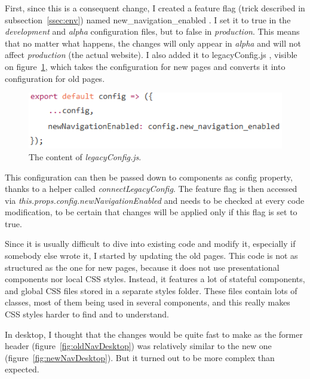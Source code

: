 First, since this is a consequent change, I created a feature flag (trick described in {\sc subsection}~\ref{ssec:env}) named \guillemotleft{} new\_navigation\_enabled \guillemotright{}. I set it to true in the \textit{development} and \textit{alpha} configuration files, but to false in \textit{production}. This means that no matter what happens, the changes will only appear in \textit{alpha} and will not affect \textit{production} (the actual website). I also added it to \guillemotleft{} legacyConfig.js \guillemotright{}, visible on {\sc figure}~\ref{fig:legacyConfig}, which takes the configuration for new pages and converts it into configuration for old pages.

\begin{figure}[H]
    \centering
    \includegraphics[scale=0.8]{figure/legacyConfig.png}
    \caption{The content of \textit{legacyConfig.js}.}
    \label{fig:legacyConfig}
\end{figure}

This configuration can then be passed down to components as \guillemotleft{} config \guillemotright{} property, thanks to a helper called \textit{connectLegacyConfig}. The feature flag is then accessed via \textit{this.props.config.newNavigationEnabled} and needs to be checked at every code modification, to be certain that changes will be applied only if this flag is set to true.

Since it is usually difficult to dive into existing code and modify it, especially if somebody else wrote it, I started by updating the old pages. This code is not as structured as the one for new pages, because it does not use presentational components nor local CSS styles. Instead, it features a lot of stateful components, and global CSS files stored in a separate \guillemotleft{} styles \guillemotright{} folder. These files contain lots of classes, most of them being used in several components, and this really makes CSS styles harder to find and to understand. 

In desktop, I thought that the changes would be quite fast to make as the former header ({\sc figure}~\ref{fig:oldNavDesktop}) was relatively similar to the new one ({\sc figure}~\ref{fig:newNavDesktop}). But it turned out to be more complex than expected.


